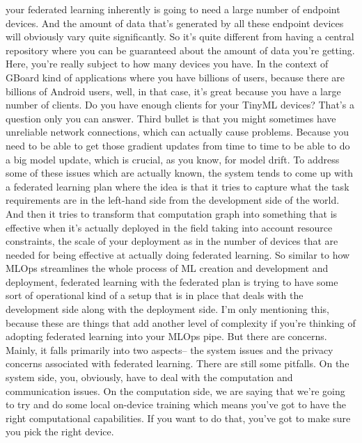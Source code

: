 {{{{{{{{{    your federated learning inherently is going
    to need a large number of endpoint devices.
    And the amount of data that's generated by all these endpoint devices
    will obviously vary quite significantly.
    So it's quite different from having a central repository where
    you can be guaranteed about the amount of data you're getting.
    Here, you're really subject to how many devices you have.
    In the context of GBoard kind of applications
    where you have billions of users, because there are billions of Android
    users, well, in that case, it's great because you
    have a large number of clients.
    Do you have enough clients for your TinyML devices?
    That's a question only you can answer.
    Third bullet is that you might sometimes have unreliable network connections,
    which can actually cause problems.
    Because you need to be able to get those gradient updates from time to time
    to be able to do a big model update, which is crucial, as you know,
    for model drift.
    To address some of these issues which are actually known,
    the system tends to come up with a federated learning plan
    where the idea is that it tries to capture what the task requirements are
    in the left-hand side from the development side of the world.
    And then it tries to transform that computation graph
    into something that is effective when it's actually
    deployed in the field taking into account resource
    constraints, the scale of your deployment
    as in the number of devices that are needed for being effective at actually
    doing federated learning.
    So similar to how MLOps streamlines the whole process of ML
    creation and development and deployment, federated
    learning with the federated plan is trying
    to have some sort of operational kind of a setup that
    is in place that deals with the development
    side along with the deployment side.
    I'm only mentioning this, because these are
    things that add another level of complexity
    if you're thinking of adopting federated learning into your MLOps pipe.
    But there are concerns.
    Mainly, it falls primarily into two aspects--
    the system issues and the privacy concerns
    associated with federated learning.
    There are still some pitfalls.
    On the system side, you, obviously, have to deal with the computation
    and communication issues.
    On the computation side, we are saying that we're
    going to try and do some local on-device training which
    means you've got to have the right computational capabilities.
    If you want to do that, you've got to make sure you pick the right device.
}}}}}}}}}
